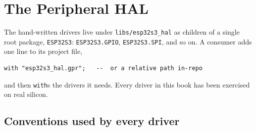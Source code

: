 \chapter{The Peripheral HAL}
\label{ch:hal}

The hand-written drivers live under \texttt{libs/esp32s3\_hal} as children of a
single root package, \texttt{ESP32S3}: \texttt{ESP32S3.GPIO},
\texttt{ESP32S3.SPI}, and so on. A consumer adds one line to its project file,

\begin{lstlisting}
with "esp32s3_hal.gpr";   --  or a relative path in-repo
\end{lstlisting}

and then \texttt{with}s the drivers it needs. Every driver in this book has been
exercised on real silicon.

\section{Conventions used by every driver}

